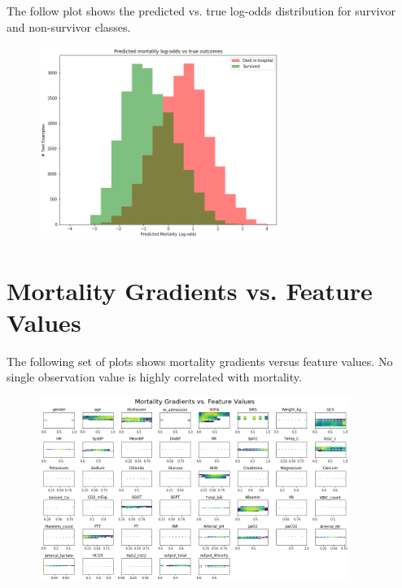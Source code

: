 \documentclass[10pt]{amia}
\begin{document}
\begin{appendices}
The follow plot shows the predicted vs. true log-odds distribution for survivor and non-survivor classes.
\begin{figure}[ht]
\centering
\includegraphics[width=0.7\textwidth]{figures/log-odds.png}
\end{figure}

\newpage
\section{Mortality Gradients vs. Feature Values}
\label{appendix:gradients}

The following set of plots shows mortality gradients versus feature values. No single observation value is highly correlated with mortality.

\begin{figure}[ht]
\centering
\includegraphics[width=0.9\textwidth]{figures/gradients}
\end{figure}

\end{appendices}
\end{document}
